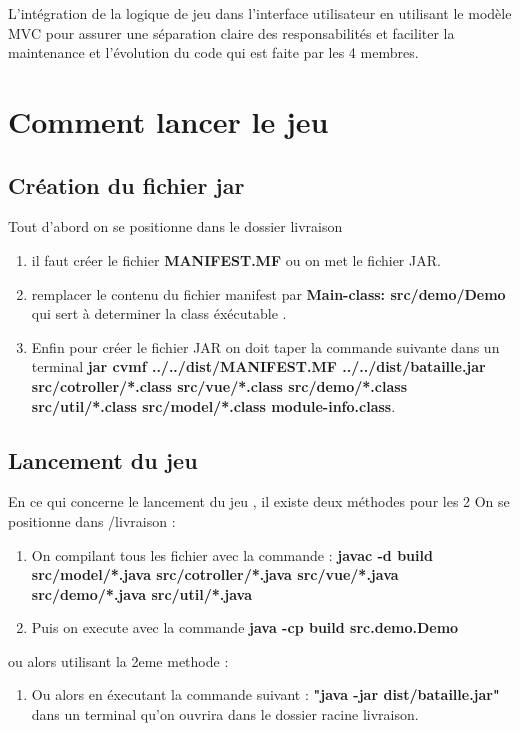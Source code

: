\documentclass{rapport}
\begin{document}
{L'intégration de la logique de jeu dans l'interface utilisateur en utilisant le modèle MVC pour assurer une séparation claire des responsabilités et faciliter la maintenance et l'évolution du code qui est faite par les 4 membres.

     
   
\section{Comment lancer le jeu}
\subsection{Création du fichier jar}


Tout d'abord on se positionne dans le dossier livraison
\begin{enumerate}
    
    \item il faut créer le fichier \textbf{MANIFEST.MF} ou on met le fichier JAR.
    \item remplacer le contenu du fichier manifest par  \textbf{Main-class: src/demo/Demo } qui sert à determiner la class éxécutable .
    \item Enfin pour créer le fichier JAR on doit taper la commande suivante dans un terminal \textbf{jar cvmf ../../dist/MANIFEST.MF ../../dist/bataille.jar src/cotroller/*.class src/vue/*.class src/demo/*.class src/util/*.class src/model/*.class module-info.class}.

\end{enumerate}
\subsection{Lancement du jeu}
En ce qui concerne le lancement du jeu , il existe deux méthodes pour les 2  On se positionne dans /livraison :
\begin{enumerate}
    \item On compilant tous les fichier avec la commande : \textbf{javac -d build src/model/*.java src/cotroller/*.java src/vue/*.java src/demo/*.java src/util/*.java}
\item  Puis on execute avec la commande  \textbf{java -cp build src.demo.Demo}


\end{enumerate}
ou alors utilisant la 2eme methode :
\begin{enumerate}
    \item Ou alors en éxecutant la commande suivant  : \textbf{"java -jar dist/bataille.jar"} dans un terminal qu'on ouvrira dans le dossier racine livraison.  
\end{enumerate}







}
\end{document}
